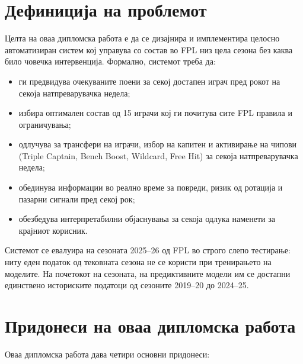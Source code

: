 \section{Дефиниција на проблемот}

Целта на оваа дипломска работа е да се дизајнира и имплементира целосно автоматизиран систем кој управува со состав во FPL низ цела сезона без каква било човечка интервенција. Формално, системот треба да:

\begin{itemize}
  \item ги предвидува очекуваните поени за секој достапен играч пред рокот на секоја натпреварувачка недела;
  \item избира оптимален состав од 15 играчи кој ги почитува сите FPL правила и ограничувања;
  \item одлучува за трансфери на играчи, избор на капитен и активирање на чипови (Triple Captain, Bench Boost, Wildcard, Free Hit) за секоја натпреварувачка недела;
  \item обединува информации во реално време за повреди, ризик од ротација и пазарни сигнали пред секој рок;
  \item обезбедува интерпретабилни објаснувања за секоја одлука наменети за крајниот корисник.
\end{itemize}

Системот се евалуира на сезоната 2025--26 од FPL во строго слепо тестирање: ниту еден податок од тековната сезона не се користи при тренирањето на моделите. На почетокот на сезоната, на предиктивните модели им се достапни единствено историските податоци од сезоните 2019--20 до 2024--25.

\section{Придонеси на оваа дипломска работа}

Оваа дипломска работа дава четири основни придонеси:

